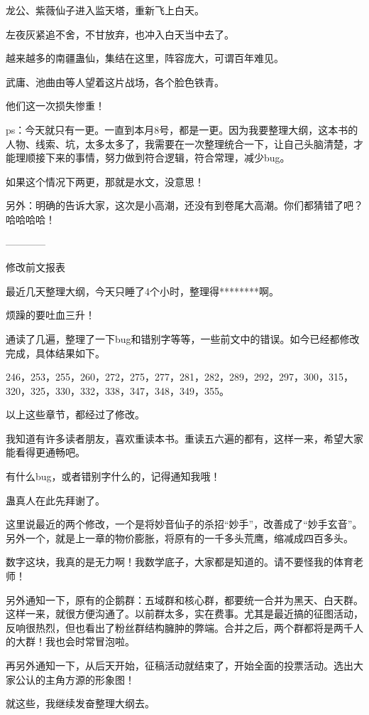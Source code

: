 \begin{this_body}
龙公、紫薇仙子进入监天塔，重新飞上白天。

左夜灰紧追不舍，不甘放弃，也冲入白天当中去了。

越来越多的南疆蛊仙，集结在这里，阵容庞大，可谓百年难见。

武庸、池曲由等人望着这片战场，各个脸色铁青。

他们这一次损失惨重！

ps：今天就只有一更。一直到本月8号，都是一更。因为我要整理大纲，这本书的人物、线索、坑，太多太多了，我需要在一次整理统合一下，让自己头脑清楚，才能理顺接下来的事情，努力做到符合逻辑，符合常理，减少bug。

如果这个情况下两更，那就是水文，没意思！

另外：明确的告诉大家，这次是小高潮，还没有到卷尾大高潮。你们都猜错了吧？哈哈哈哈！

------------

修改前文报表

最近几天整理大纲，今天只睡了4个小时，整理得********啊。

烦躁的要吐血三升！

通读了几遍，整理了一下bug和错别字等等，一些前文中的错误。如今已经都修改完成，具体结果如下。

246，253，255，260，272，275，277，281，282，289，292，297，300，315，320，325，330，332，338，347，348，349，355。

以上这些章节，都经过了修改。

我知道有许多读者朋友，喜欢重读本书。重读五六遍的都有，这样一来，希望大家能看得更通畅吧。

有什么bug，或者错别字什么的，记得通知我哦！

蛊真人在此先拜谢了。

这里说最近的两个修改，一个是将妙音仙子的杀招“妙手”，改善成了“妙手玄音”。另外一个，就是上一章的物价膨胀，将原有的一千多头荒鹰，缩减成四百多头。

数字这块，我真的是无力啊！我数学底子，大家都是知道的。请不要怪我的体育老师！

另外通知一下，原有的企鹅群：五域群和核心群，都要统一合并为黑天、白天群。这样一来，就很方便沟通了。以前群太多，实在费事。尤其是最近搞的征图活动，反响很热烈，但也看出了粉丝群结构臃肿的弊端。合并之后，两个群都将是两千人的大群！我也会时常冒泡啦。

再另外通知一下，从后天开始，征稿活动就结束了，开始全面的投票活动。选出大家公认的主角方源的形象图！

就这些，我继续发奋整理大纲去。

\end{this_body}

